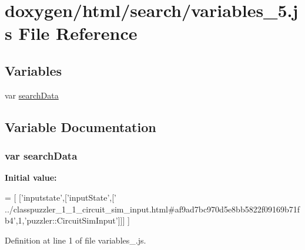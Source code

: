 \hypertarget{a00109}{}\section{doxygen/html/search/variables\+\_\+5.js File Reference}
\label{a00109}
\subsection*{Variables}
\begin{DoxyCompactItemize}
\item 
var \hyperlink{a00109_ad01a7523f103d6242ef9b0451861231e}{search\+Data}
\end{DoxyCompactItemize}


\subsection{Variable Documentation}
\hypertarget{a00109_ad01a7523f103d6242ef9b0451861231e}{}
\subsubsection[{search\+Data}]{\setlength{\rightskip}{0pt plus 5cm}var search\+Data}\label{a00109_ad01a7523f103d6242ef9b0451861231e}
{\bfseries Initial value\+:}
\begin{DoxyCode}
=
[
  [\textcolor{stringliteral}{'inputstate'},[\textcolor{stringliteral}{'inputState'},[\textcolor{stringliteral}{'
      ../classpuzzler\_1\_1\_circuit\_sim\_input.html#af9ad7bc970d5e8bb5822f09169b71fb4'},1,\textcolor{stringliteral}{'puzzler::CircuitSimInput'}]]]
]
\end{DoxyCode}


Definition at line 1 of file variables\+\_.\+js.

